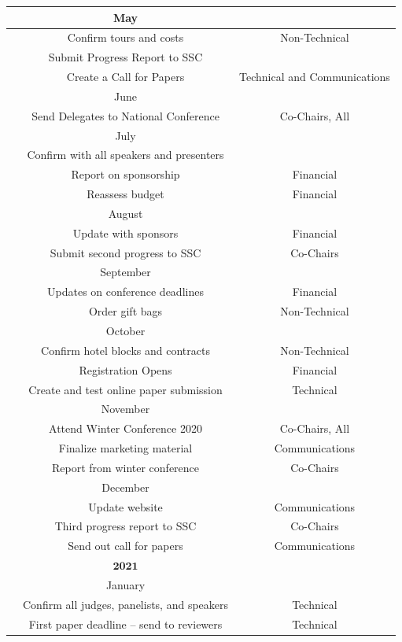 \begin{center}
\begin{longtable}{c |  c  c}
\hline\hline
&May&\\
\hline\hline
& Confirm tours and costs& Non-Technical\\
& Submit Progress Report to SSC& \\
& Create a Call for Papers & Technical and Communications\\
\hline\hline
&June&\\
\hline\hline
& Send Delegates to National Conference& Co-Chairs, All\\
\hline\hline
&July&\\
\hline\hline
& Confirm with all speakers and presenters& \\
& Report on sponsorship& Financial\\
& Reassess budget& Financial\\
\hline\hline
&August&\\
\hline\hline
& Update with sponsors& Financial\\
& Submit second progress to SSC& Co-Chairs\\
\hline\hline
&September&\\
\hline\hline
& Updates on conference deadlines& Financial\\
& Order gift bags& Non-Technical\\
\hline\hline
&October&\\
\hline\hline
& Confirm hotel blocks and contracts& Non-Technical\\
& Registration Opens& Financial\\
& Create and test online paper submission& Technical\\
\hline\hline
&November&\\
\hline\hline
& Attend Winter Conference 2020& Co-Chairs, All\\
& Finalize marketing material& Communications\\
& Report from winter conference & Co-Chairs\\
\hline\hline
&December&\\
\hline\hline
& Update website & Communications \\
& Third progress report to SSC& Co-Chairs\\
& Send out call for papers& Communications\\
\hline\hline
&$\textbf{2021}$&\\
\hline\hline
&January&\\
\hline\hline
& Confirm all judges, panelists, and speakers& Technical\\
& First paper deadline -- send to reviewers & Technical\\

\end{longtable}
\end{center}
